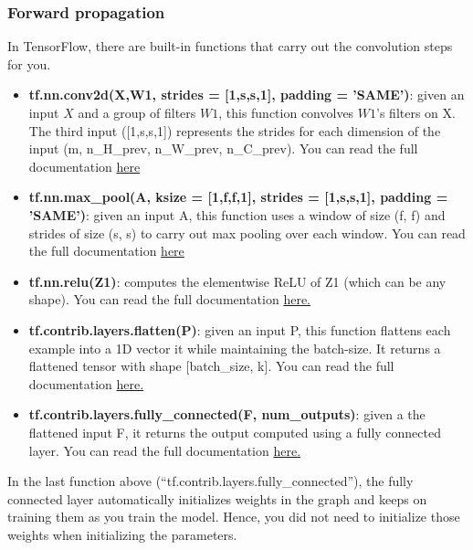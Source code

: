 \subsubsection{Forward propagation}
In TensorFlow, there are built-in functions that carry out the convolution steps for you.
\begin{itemize}
\item {\textbf{tf.nn.conv2d(X,W1, strides = [1,s,s,1], padding = 'SAME')}}: given an input $X$ and a group of filters $W1$, this function convolves $W1$'s filters on X. The third input ([1,s,s,1]) represents the strides for each dimension of the input (m, n\_H\_prev, n\_W\_prev, n\_C\_prev). You can read the full documentation \href{https://www.tensorflow.org/api_docs/python/tf/nn/conv2d}{here}

\item {\textbf{tf.nn.max\_pool(A, ksize = [1,f,f,1], strides = [1,s,s,1], padding = 'SAME')}}: given an input A, this function uses a window of size (f, f) and strides of size (s, s) to carry out max pooling over each window. You can read the full documentation \href{https://www.tensorflow.org/api_docs/python/tf/nn/max_pool}{here}

\item {\textbf{tf.nn.relu(Z1)}}: computes the elementwise ReLU of Z1 (which can be any shape). You can read the full documentation \href{https://www.tensorflow.org/api_docs/python/tf/nn/relu}{here.}

\item {\textbf{tf.contrib.layers.flatten(P)}}: given an input P, this function flattens each example into a 1D vector it while maintaining the batch-size. It returns a flattened tensor with shape [batch\_size, k]. You can read the full documentation \href{https://www.tensorflow.org/api_docs/python/tf/contrib/layers/flatten}{here.}

\item {\textbf{tf.contrib.layers.fully\_connected(F, num\_outputs)}}: given a the flattened input F, it returns the output computed using a fully connected layer. You can read the full documentation \href{https://www.tensorflow.org/api_docs/python/tf/contrib/layers/fully_connected}{here.}
\end{itemize} 

In the last function above (``tf.contrib.layers.fully\_connected''), the fully connected layer automatically initializes weights in the graph and keeps on training them as you train the model. Hence, you did not need to initialize those weights when initializing the parameters. 


